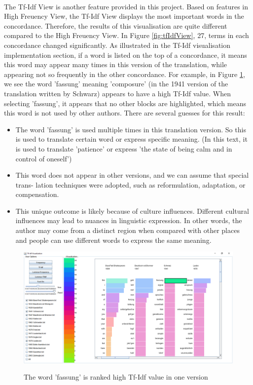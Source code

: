 \paragraph[]{}The Tf-Idf View is another feature provided in this project. Based on features in High Freuency View, the Tf-Idf View displays the most important words in the concordance. Therefore, the results of this visualisation are quite different compared to the High Freuency View. In Figure \ref{fig:tfIdfView}, 27, terms in each concordance changed significantly. As illustrated in the Tf-Idf visualisation implementation section, if a word is listed on the top of a concordance, it means this word may appear many times in this version of the translation, while appearing not so frequently in the other concordance. For example, in Figure \ref{fig:fassung}, we see the word 'fassung' meaning 'composure' (in the 1941 version of the translation written by Schwarz) appears to have a high Tf-Idf value. When selecting 'fassung', it appears that no other blocks are highlighted, which means this word is not used by other authors. There are several guesses for this result:
\begin{itemize} 	
	\item \textbf{} The word 'fassung' is used multiple times in this translation version. So this is used to translate certain word or express specific meaning. (In this text, it is used to translate 'patience' or express 'the state of being calm and in control of oneself')
	\item \textbf{} This word does not appear in other versions, and we can assume that special trans- lation techniques were adopted, such as reformulation, adaptation, or compensation. 
	\item \textbf{} This unique outcome is likely because of  culture influences. Different cultural influences may lead to nuances in linguistic expression. In other words, the author may come from a distinct region when compared with other places and people can use different words to express the same meaning.
\end{itemize} 

\begin{figure}[H]
	\centering	
	\includegraphics[width=\textwidth]{Figs/Fassung}\\[1ex]
	\caption{The word 'fassung' is ranked high Tf-Idf value in one version}
	\label{fig:fassung}
\end{figure} 

